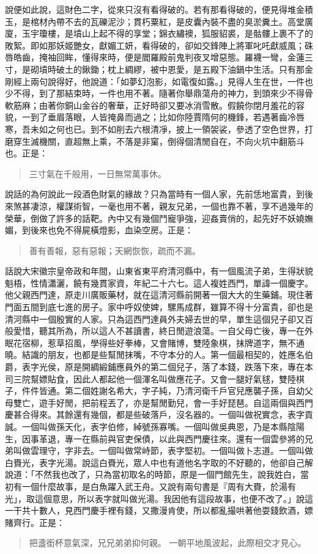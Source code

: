 說便如此說，這財色二字，從來只沒有看得破的。若有那看得破的，便見得堆金積玉，是棺材內帶不去的瓦礫泥沙；貫朽粟紅，是皮囊內裝不盡的臭淤糞土。高堂廣廈，玉宇瓊樓，是墳山上起不得的享堂；錦衣繡襖，狐服貂裘，是骷髏上裹不了的敗絮。即如那妖姬艷女，獻媚工妍，看得破的，卻如交鋒陣上將軍叱吒獻威風；硃唇皓齒，掩袖回眸，懂得來時，便是閻羅殿前鬼判夜叉增惡態。羅襪一彎，金蓮三寸，是砌墳時破土的鍬鋤；枕上綢繆，被中恩愛，是五殿下油鍋中生活。只有那金剛經上兩句說得好，他說道：「如夢幻泡影，如電復如露。」見得人生在世，一件也少不得，到了那結束時，一件也用不著。隨著你舉鼎蕩舟的神力，到頭來少不得骨軟筋麻；由著你銅山金谷的奢華，正好時卻又要冰消雪散。假饒你閉月羞花的容貌，一到了垂眉落眼，人皆掩鼻而過之；比如你陸賈隋何的機鋒，若遇著齒冷唇寒，吾未如之何也已。到不如削去六根清凈，披上一領袈裟，參透了空色世界，打磨穿生滅機關，直超無上乘，不落是非窠，倒得個清閒自在，不向火坑中翻筋斗也。正是：
\begin{quote}
三寸氣在千般用，一日無常萬事休。
\end{quote}

說話的為何說此一段酒色財氣的緣故？只為當時有一個人家，先前恁地富貴，到後來煞甚凄涼，權謀術智，一毫也用不著，親友兄弟，一個也靠不著，享不過幾年的榮華，倒做了許多的話靶。內中又有幾個鬥寵爭強，迎姦賣俏的，起先好不妖嬈嫵媚，到後來也免不得屍橫燈影，血染空房。正是：
\begin{quote}
善有善報，惡有惡報；天網恢恢，疏而不漏。
\end{quote}

話說大宋徽宗皇帝政和年間，山東省東平府清河縣中，有一個風流子弟，生得狀貌魁梧，性情瀟灑，饒有幾貫家資，年紀二十六七。這人複姓西門，單諱一個慶字。他父親西門達，原走川廣販藥材，就在這清河縣前開著一個大大的生藥鋪。現住著門面五間到底七進的房子。家中呼奴使婢，騾馬成群，雖算不得十分富貴，卻也是清河縣中一個殷實的人家。只為這西門達員外夫婦去世的早，單生這個兒子卻又百般愛惜，聽其所為，所以這人不甚讀書，終日閒遊浪蕩。一自父母亡後，專一在外眠花宿柳，惹草招風，學得些好拳棒，又會賭博，雙陸象棋，抹牌道字，無不通曉。結識的朋友，也都是些幫閒抹嘴，不守本分的人。第一個最相契的，姓應名伯爵，表字光侯，原是開綢緞鋪應員外的第二個兒子，落了本錢，跌落下來，專在本司三院幫嫖貼食，因此人都起他一個渾名叫做應花子。又會一腿好氣毬，雙陸棋子，件件皆通。第二個姓謝名希大，字子純，乃清河衛千戶官兒應襲子孫，自幼父母雙亡，遊手好閒，把前程丟了，亦是幫閒勤兒，會一手好琵琶。自這兩個與西門慶甚合得來。其餘還有幾個，都是些破落戶，沒名器的。一個叫做祝實念，表字貢誠。一個叫做孫天化，表字伯修，綽號孫寡嘴。一個叫做吳典恩，乃是本縣陰陽生，因事革退，專一在縣前與官吏保債，以此與西門慶往來。還有一個雲參將的兄弟叫做雲理守，字非去。一個叫做常峙節，表字堅初。一個叫做卜志道。一個叫做白賚光，表字光湯。說這白賚光，眾人中也有道他名字取的不好聽的，他卻自己解說道：「不然我也改了，只為當初取名的時節，原是一個門館先生，說我姓白，當初有一個什麼故事，是白魚躍入武王舟。又說有兩句書是『周有大賚，於湯有光」，取這個意思，所以表字就叫做光湯。我因他有這段故事，也便不改了。」說這一干共十數人，見西門慶手裡有錢，又撒漫肯使，所以都亂撮哄著他耍錢飲酒，嫖賭齊行。正是：
\begin{quote}
把盞銜杯意氣深，兄兄弟弟抑何親。
一朝平地風波起，此際相交才見心。
\end{quote}


